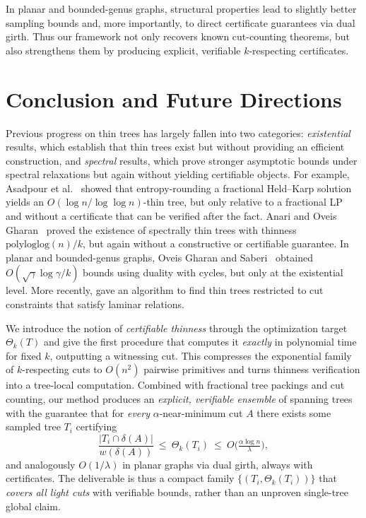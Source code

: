\documentclass[11pt,letterpaper]{article}
\renewcommand{\paragraph}[1]{\medskip\noindent{\bf #1}\xspace}
\begin{document}
\medskip
In planar and bounded-genus graphs, structural properties
lead to slightly better sampling bounds and, more importantly,
to direct certificate guarantees via dual girth.
Thus our framework not only recovers known cut-counting theorems,
but also strengthens them by producing explicit, verifiable
$k$-respecting certificates.

\section{Conclusion and Future Directions}
\label{sec:summary}
Previous progress on thin trees has largely fallen into two categories:
\emph{existential} results, which establish that thin trees exist but without providing an
efficient construction, and \emph{spectral} results, which prove stronger asymptotic bounds
under spectral relaxations but again without yielding certifiable objects. For example,
Asadpour et al.~\cite{asadpour2017} showed that entropy-rounding a fractional Held--Karp
solution yields an $O(\log n/\log\log n)$-thin tree, but only relative to a fractional LP and
without a certificate that can be verified after the fact. Anari and Oveis Gharan~\cite{anariog2015focs}
proved the existence of spectrally thin trees with thinness $\mathrm{polyloglog}(n)/k$, but
again without a constructive or certifiable guarantee. In planar and bounded-genus graphs,
Oveis Gharan and Saberi~\cite{OS11} obtained $O(\sqrt{\gamma}\log \gamma/k)$ bounds using
duality with cycles, but only at the existential level. More recently, \cite{thin-tree-klien} gave an algorithm to find thin trees restricted to cut constraints that satisfy laminar relations.

\paragraph{What we add.}
We introduce the notion of \emph{certifiable thinness} through the optimization target
$\Theta_k(T)$ and give the first procedure that computes it \emph{exactly} in polynomial time
for fixed $k$, outputting a witnessing cut. This compresses the exponential family of
$k$-respecting cuts to $O(n^2)$ pairwise primitives and turns thinness verification into a
tree-local computation. Combined with fractional tree packings and cut counting, our method
produces an \emph{explicit, verifiable ensemble} of spanning trees with the guarantee that for
\emph{every} $\alpha$-near-minimum cut $A$ there exists some sampled tree $T_i$ certifying
\[
\frac{|T_i\cap\delta(A)|}{w(\delta(A))}\ \le\ \Theta_k(T_i)\ \le\ O\!\Big(\tfrac{\alpha\log n}{\lambda}\Big),
\]
and analogously $O(1/\lambda)$ in planar graphs via dual girth, always with certificates.
The deliverable is thus a compact family $\{(T_i,\Theta_k(T_i))\}$ that \emph{covers all light cuts}
with verifiable bounds, rather than an unproven single-tree global claim.
\end{document}
